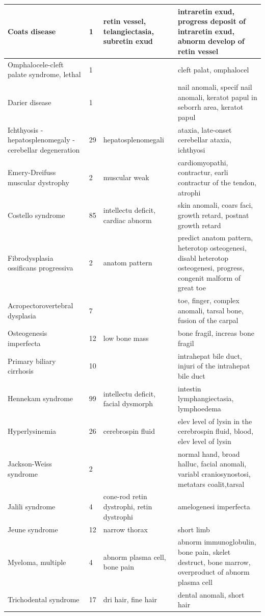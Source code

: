 \documentclass[10pt,letterpaper,two column,final]{article}
\begin{document}
\begin{center}
\begin{small}
\begin{longtable}{|p{3.5cm}|p{1.5cm}|p{3cm}|p{3cm}|}
Coats disease & 1 & retin vessel, telangiectasia, subretin exud &  intraretin exud, progress deposit of intraretin exud, abnorm develop of retin vessel \\ \hline
Omphalocele-cleft palate syndrome, lethal & 1 &  &  cleft palat, omphalocel \\ \hline
Darier disease & 1 &  &  nail anomali, specif nail anomali, keratot papul in seborrh area, keratot papul \\ \hline
Ichthyosis - hepatosplenomegaly - cerebellar degeneration & 29 & hepatosplenomegali & ataxia, late-onset cerebellar ataxia, ichthyosi \\ \hline
Emery-Dreifuss muscular dystrophy & 2 & muscular weak &  cardiomyopathi, contractur, earli contractur of the tendon, atrophi \\ \hline
Costello syndrome & 85 & intellectu deficit, cardiac abnorm &  skin anomali, coars faci, growth retard, postnat growth retard \\ \hline
Fibrodysplasia ossificans progressiva & 2 & anatom pattern  & predict anatom pattern, heterotop osteogenesi, disabl heterotop osteogenesi, progress, congenit malform of great toe  \\ \hline
Acropectorovertebral dysplasia & 7 &  & toe, finger, complex anomali, tarsal bone, fusion of the carpal \\ \hline
Osteogenesis imperfecta & 12 & low bone mass & bone fragil, increas bone fragil \\ \hline
Primary biliary cirrhosis & 10  &  & intrahepat bile duct, injuri of the intrahepat bile duct \\ \hline
Hennekam syndrome & 99 & intellectu deficit, facial dysmorph & intestin lymphangiectasia, lymphoedema \\ \hline
Hyperlysinemia & 26  & cerebrospin fluid & elev level of lysin in the cerebrospin fluid, blood, elev level of lysin \\ \hline
Jackson-Weiss syndrome & 2 &  & normal hand, broad halluc, facial anomali, variabl craniosynostosi, metatars coalit,tarsal \\ \hline
Jalili syndrome & 4 & cone-rod retin dystrophi, retin dystrophi  & amelogenesi imperfecta \\ \hline
Jeune syndrome & 12 & narrow thorax &  short limb \\ \hline
Myeloma, multiple & 4 & abnorm plasma cell, bone pain & abnorm immunoglobulin, bone pain, skelet destruct, bone marrow, overproduct of abnorm plasma cell \\ \hline
Trichodental syndrome & 17 & dri hair, fine hair & dental anomali, short hair  \\ \hline
	\end{longtable}
\end{small}
\end{center}
\end{document}
